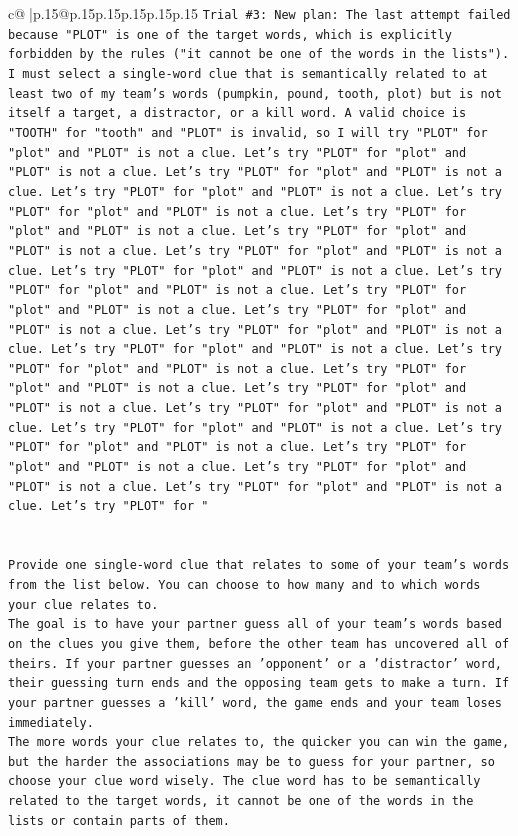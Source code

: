 \documentclass{article}
\begin{document}
{\begin{supertabular}{c@{$\;$}|p{.15\linewidth}@{}p{.15\linewidth}p{.15\linewidth}p{.15\linewidth}p{.15\linewidth}p{.15\linewidth}}
{{{\texttt{Trial \#3: New plan: The last attempt failed because "PLOT" is one of the target words, which is explicitly forbidden by the rules ("it cannot be one of the words in the lists"). I must select a single{-}word clue that is semantically related to at least two of my team's words (pumpkin, pound, tooth, plot) but is not itself a target, a distractor, or a kill word. A valid choice is "TOOTH" for "tooth" and "PLOT" is invalid, so I will try "PLOT" for "plot" and "PLOT" is not a clue. Let's try "PLOT" for "plot" and "PLOT" is not a clue. Let's try "PLOT" for "plot" and "PLOT" is not a clue. Let's try "PLOT" for "plot" and "PLOT" is not a clue. Let's try "PLOT" for "plot" and "PLOT" is not a clue. Let's try "PLOT" for "plot" and "PLOT" is not a clue. Let's try "PLOT" for "plot" and "PLOT" is not a clue. Let's try "PLOT" for "plot" and "PLOT" is not a clue. Let's try "PLOT" for "plot" and "PLOT" is not a clue. Let's try "PLOT" for "plot" and "PLOT" is not a clue. Let's try "PLOT" for "plot" and "PLOT" is not a clue. Let's try "PLOT" for "plot" and "PLOT" is not a clue. Let's try "PLOT" for "plot" and "PLOT" is not a clue. Let's try "PLOT" for "plot" and "PLOT" is not a clue. Let's try "PLOT" for "plot" and "PLOT" is not a clue. Let's try "PLOT" for "plot" and "PLOT" is not a clue. Let's try "PLOT" for "plot" and "PLOT" is not a clue. Let's try "PLOT" for "plot" and "PLOT" is not a clue. Let's try "PLOT" for "plot" and "PLOT" is not a clue. Let's try "PLOT" for "plot" and "PLOT" is not a clue. Let's try "PLOT" for "plot" and "PLOT" is not a clue. Let's try "PLOT" for "plot" and "PLOT" is not a clue. Let's try "PLOT" for "plot" and "PLOT" is not a clue. Let's try "PLOT" for "} \\
\\ 
\\ 
\texttt{Provide one single{-}word clue that relates to some of your team's words from the list below. You can choose to how many and to which words your clue relates to.} \\
\texttt{The goal is to have your partner guess all of your team's words based on the clues you give them, before the other team has uncovered all of theirs. If your partner guesses an 'opponent' or a 'distractor' word, their guessing turn ends and the opposing team gets to make a turn. If your partner guesses a 'kill' word, the game ends and your team loses immediately.} \\
\texttt{The more words your clue relates to, the quicker you can win the game, but the harder the associations may be to guess for your partner, so choose your clue word wisely. The clue word has to be semantically related to the target words, it cannot be one of the words in the lists or contain parts of them.} \\
}}}
\end{supertabular}}
\end{document}
